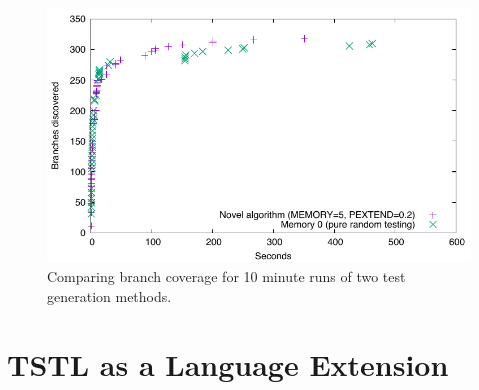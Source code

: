 \begin{figure}
\includegraphics[width=\columnwidth]{memory}
\caption{Comparing branch coverage for 10 minute runs of two test generation methods.}
\label{fig:compare}
\end{figure}

\section{TSTL as a Language Extension}
\label{sec:langext}